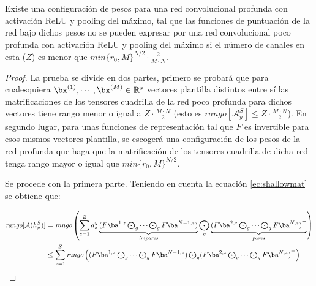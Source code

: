 \begin{teorema} \label{teo:efiProfConvMax}
Existe una configuración de pesos para una red convolucional profunda con activación ReLU y pooling del máximo, tal que las funciones de puntuación de la red bajo dichos pesos no se pueden expresar por una red convolucional poco profunda con activación ReLU y pooling del máximo si el número de canales en esta ($Z$) es menor que $\textit{min}\{r_0,M\}^{N/2}\cdot \frac{2}{M\cdot N}$.
\end{teorema}
\begin{proof}
La prueba se divide en dos partes, primero se probará que para cualesquiera $\bx^{(1)},\cdots ,\bx^{(M)}\in\mathbb{R}^{s}$ vectores plantilla distintos entre sí las matrificaciones de los tensores cuadrilla de la red poco profunda para dichos vectores tiene rango menor o igual a $Z\cdot \frac{M\cdot N}{2}$ (esto es $\textit{rango}[\mathcal{A}^S_y] \leq Z\cdot \frac{M\cdot N}{2}$). En segundo lugar, para unas funciones de representación tal que $F$ es invertible para esos mismos vectores plantilla, se escogerá una configuración de los pesos de la red profunda que haga que la matrificación de los tensores cuadrilla de dicha red tenga rango mayor o igual que $\textit{min}\{r_0,M\}^{N/2}$.

Se procede con la primera parte. Teniendo en cuenta la ecuación \eqref{ec:shallowmat} se obtiene que:


\begin{align*}
\textit{rango}[\mathcal{A}(h_y^S)]&= \textit{rango}\left(\sum_{z=1}^{Z}a^y_z\underbrace{(F\ba^{1,z}\textstyle   \bigodot_g \cdots  \bigodot_g F\ba^{N-1,z})}_{\textit{impares}} \bigodot_g \underbrace{(F\ba^{2,z}\textstyle  \bigodot_g \cdots  \bigodot_g F\ba^{N,z})^\top}_{\textit{pares}} \right) \\
&\leq \sum_{z=1}^{Z} \textit{rango}\left((F\ba^{1,z}\textstyle   \bigodot_g \cdots  \bigodot_g F\ba^{N-1,z})\bigodot_g(F\ba^{2,z}\textstyle  \bigodot_g \cdots  \bigodot_g F\ba^{N,z})^\top \right) 
\end{align*}


\end{proof}
